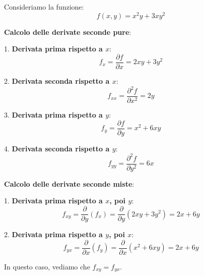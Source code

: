 \documentclass{article}
\begin{document}
Consideriamo la funzione:
\[
f(x, y) = x^2y + 3xy^2
\]

\textbf{Calcolo delle derivate seconde pure}:

1. \textbf{Derivata prima rispetto a \( x \)}:
   \[
   f_x = \frac{\partial f}{\partial x} = 2xy + 3y^2
   \]

2. \textbf{Derivata seconda rispetto a \( x \)}:
   \[
   f_{xx} = \frac{\partial^2 f}{\partial x^2} = 2y
   \]

3. \textbf{Derivata prima rispetto a \( y \)}:
   \[
   f_y = \frac{\partial f}{\partial y} = x^2 + 6xy
   \]

4. \textbf{Derivata seconda rispetto a \( y \)}:
   \[
   f_{yy} = \frac{\partial^2 f}{\partial y^2} = 6x
   \]

\textbf{Calcolo delle derivate seconde miste}:

1. \textbf{Derivata prima rispetto a \( x \), poi \( y \)}:
   \[
   f_{xy} = \frac{\partial}{\partial y}(f_x) = \frac{\partial}{\partial y}(2xy + 3y^2) = 2x + 6y
   \]

2. \textbf{Derivata prima rispetto a \( y \), poi \( x \)}:
   \[
   f_{yx} = \frac{\partial}{\partial x}(f_y) = \frac{\partial}{\partial x}(x^2 + 6xy) = 2x + 6y
   \]

In questo caso, vediamo che \( f_{xy} = f_{yx} \).
\end{document}
